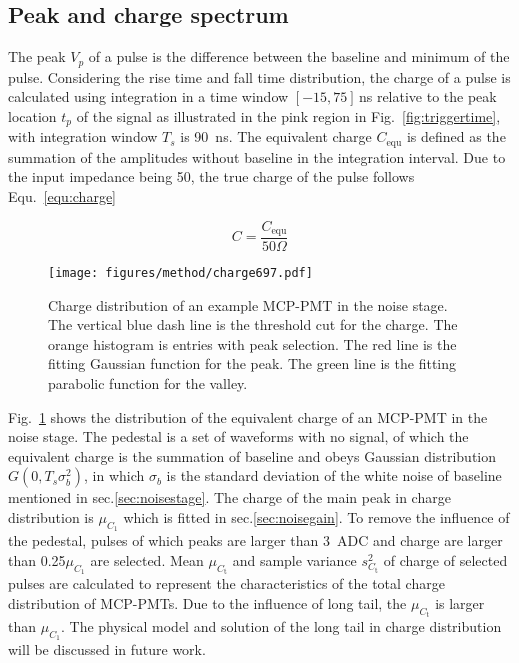 
\subsection{Peak and charge spectrum}
\label{sec:noisepeak}

The peak $V_p$ of a pulse is the difference between the baseline and minimum of the pulse. Considering the rise time and fall time distribution, the charge of a pulse is calculated using integration in a time window $[-15, 75]$\,ns relative to the peak location $t_p$ of the signal as illustrated in the pink region in Fig.~\ref{fig:triggertime}, with integration window $T_s$ is \SI{90}{ns}. The equivalent charge $C_{\mathrm{equ}}$ is defined as the summation of the amplitudes without baseline in the integration interval. Due to the input impedance being \SI{50}{\Omega}, the true charge of the pulse follows Equ.~\eqref{equ:charge}

\begin{equation}
    \label{equ:charge}
    C = \frac{C_{\mathrm{equ}}}{50 \Omega}
\end{equation}

\begin{figure}[!htbp]
    \centering
    \texttt{[image: figures/method/charge697.pdf]}
    \caption{Charge distribution of an example MCP-PMT in the noise stage. The vertical blue dash line is the threshold cut for the charge. The orange histogram is entries with peak selection. The red line is the fitting Gaussian function for the peak. The green line is the fitting parabolic function for the valley.}
    \label{fig:charge}
\end{figure}

Fig.~\ref{fig:charge} shows the distribution of the equivalent charge of an MCP-PMT in the noise stage. The pedestal is a set of waveforms with no signal, of which the equivalent charge is the summation of baseline and obeys Gaussian distribution $G(0, T_s\sigma_b^2)$, in which $\sigma_b$ is the standard deviation of the white noise of baseline mentioned in sec.\ref{sec:noisestage}. The charge of the main peak in charge distribution is $\mu_{C_1}$ which is fitted in sec.\ref{sec:noisegain}. To remove the influence of the pedestal, pulses of which peaks are larger than \SI{3}{ADC} and charge are larger than 0.25$\mu_{C_1}$ are selected. Mean $\mu_{C_{\mathrm{t}}}$ and sample variance $s^2_{C_{\mathrm{t}}}$ of charge of selected pulses are calculated to represent the characteristics of the total charge distribution of MCP-PMTs. Due to the influence of long tail, the $\mu_{C_{\mathrm{t}}}$ is larger than $\mu_{C_1}$. The physical model and solution of the long tail in charge distribution will be discussed in future work.

